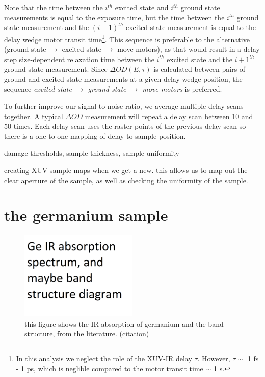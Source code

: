 Note that the time between the $i^{th}$ excited state and $i^{th}$ ground state measurements is equal to the exposure time, but the time between the $i^{th}$ ground state measurement and the $(i+1)^{th}$ excited state measurement is equal to the delay wedge motor transit time\footnote{In this analysis we neglect the role of the XUV-IR delay $\tau$. However, $\tau \sim$ 1 fs - 1 ps, which is neglible compared to the motor transit time $\sim$ 1 s.}. This sequence is preferable to the alternative (ground state $\rightarrow$ excited state $\rightarrow$ move motors), as that would result in a delay step size-dependent relaxation time between the $i^{th}$ excited state and the $i+1^{th}$ ground state measurement. Since $\Delta OD(E,\tau)$ is calculated between pairs of ground and excited state measurements at a given delay wedge position, the sequence \textit{excited state $\rightarrow$ ground state $\rightarrow$ move motors} is preferred.

To further improve our signal to noise ratio, we average multiple delay scans together. A typical $\Delta OD$ measurement will repeat a delay scan between 10 and 50 times. Each delay scan uses the raster points of the previous delay scan so there is a one-to-one mapping of delay to sample position.



damage thresholds, sample thickness, sample uniformity

creating XUV sample maps when we get a new. this allows us to map out the clear aperture of the sample, as well as checking the uniformity of the sample.


\section{the germanium sample}

\begin{figure}
	\centering
	\includegraphics[width=0.5\textwidth]{figures/chap3/Ge_IR_absorption.png}
	\caption{this figure shows the IR absorption of germanium and the band structure, from the literature. (citation)}
	\label{fig:Ge_IR_absorption}
\end{figure}


